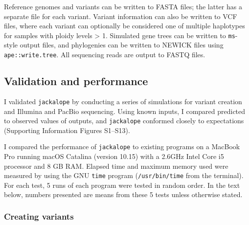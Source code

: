 \documentclass[12pt,]{article}
\begin{document}
Reference genomes and variants can be written to FASTA files; the latter
has a separate file for each variant.
Variant information can also be written to VCF files, where each variant can
optionally be considered one of multiple haplotypes for samples with ploidy levels \textgreater{} 1.
Simulated gene trees can be written to \texttt{ms}-style output files, and phylogenies can be
written to NEWICK files using \texttt{ape::write.tree}.
All sequencing reads are output to FASTQ files.

\hypertarget{validation-and-performance}{%
\subsection{Validation and performance}\label{validation-and-performance}}

I validated \texttt{jackalope} by conducting a series of simulations for variant creation
and Illumina and PacBio sequencing.
Using known inputs, I compared predicted to observed values of outputs,
and \texttt{jackalope} conformed closely to expectations
(Supporting Information Figures S1--S13).

I compared the performance of \texttt{jackalope} to existing programs on a MacBook
Pro running macOS Catalina (version 10.15) with a 2.6GHz Intel Core i5 processor
and 8 GB RAM.
Elapsed time and maximum memory used were measured by using the GNU \texttt{time} program
(\texttt{/usr/bin/time} from the terminal).
For each test, 5 runs of each program were tested in random order.
In the text below, numbers presented are means from these 5 tests unless otherwise stated.

\hypertarget{creating-variants-1}{%
\subsubsection{Creating variants}\label{creating-variants-1}}
\end{document}
